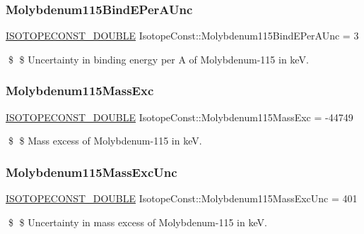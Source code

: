 \subsubsection{\texorpdfstring{Molybdenum115\+Bind\+E\+Per\+A\+Unc}{Molybdenum115BindEPerAUnc}}
{\footnotesize\ttfamily \mbox{\hyperlink{group___isotope_const-_macros_ga8f45a7272ce02c0b4c65c44636ed719a}{I\+S\+O\+T\+O\+P\+E\+C\+O\+N\+S\+T\+\_\+\+D\+O\+U\+B\+LE}} Isotope\+Const\+::\+Molybdenum115\+Bind\+E\+Per\+A\+Unc = 3}

\$ \$ Uncertainty in binding energy per A of Molybdenum-\/115 in keV. \mbox{\label{group___isotope_const-_molybdenum-_mo115_gaffb5015d3066c824b0ad4ffa179339a6}} 
\subsubsection{\texorpdfstring{Molybdenum115\+Mass\+Exc}{Molybdenum115MassExc}}
{\footnotesize\ttfamily \mbox{\hyperlink{group___isotope_const-_macros_ga8f45a7272ce02c0b4c65c44636ed719a}{I\+S\+O\+T\+O\+P\+E\+C\+O\+N\+S\+T\+\_\+\+D\+O\+U\+B\+LE}} Isotope\+Const\+::\+Molybdenum115\+Mass\+Exc = -\/44749}

\$ \$ Mass excess of Molybdenum-\/115 in keV. \mbox{\label{group___isotope_const-_molybdenum-_mo115_ga65b4117fa1b351f16aa84b47082558f1}} 
\subsubsection{\texorpdfstring{Molybdenum115\+Mass\+Exc\+Unc}{Molybdenum115MassExcUnc}}
{\footnotesize\ttfamily \mbox{\hyperlink{group___isotope_const-_macros_ga8f45a7272ce02c0b4c65c44636ed719a}{I\+S\+O\+T\+O\+P\+E\+C\+O\+N\+S\+T\+\_\+\+D\+O\+U\+B\+LE}} Isotope\+Const\+::\+Molybdenum115\+Mass\+Exc\+Unc = 401}

\$ \$ Uncertainty in mass excess of Molybdenum-\/115 in keV. \mbox{\label{group___isotope_const-_molybdenum-_mo115_ga23ebf15faa437ba15dbdcffe98b1a5ee}} 
